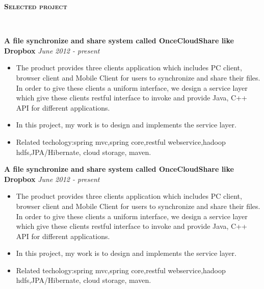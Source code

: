 \documentclass[9pt]{article}
\newenvironment{changemargin}[2]{%
  \begin{list}{}{%
    \setlength{\topsep}{0pt}%
    \setlength{\leftmargin}{#1}%
    \setlength{\rightmargin}{#2}%
    \setlength{\listparindent}{\parindent}%
    \setlength{\itemindent}{\parindent}%
    \setlength{\parsep}{\parskip}%
  }%
  \item[]}{\end{list}
}
\newcommand{\lineover}{
	\begin{changemargin}{-0.05in}{-0.05in}
		\vspace*{-8pt}
		\hrulefill \\
		\vspace*{-2pt}
	\end{changemargin}
}
\newcommand{\header}[1]{
	\begin{changemargin}{-0.5in}{-0.5in}
		\scshape{#1}\\
  	\lineover
	\end{changemargin}
}
\newenvironment{body} {
	\vspace*{-16pt}
	\begin{changemargin}{-0.25in}{-0.5in}
  }	
	{\end{changemargin}
}
\begin{document}
\smallskip


\header{\textbf{Selected project}}

\begin{body}
	\vspace{14pt}
	\textbf{A file synchronize and share system called OnceCloudShare like Dropbox} \hfill \emph{June 2012 - present}\\
	\vspace*{-4pt}
	\begin{itemize} \itemsep -0pt  %
		\item The product provides three clients application which includes PC client, browser client and Mobile Client for users to synchronize and share their files.
			 In order to give these clients a uniform interface, we design a service layer which give these clients restful interface to invoke and provide Java, C++ API for  different applications.
		\item In this project, my work is to design and implements the service layer. 
		\item Related techology:spring mvc,spring core,restful webservice,hadoop hdfs,JPA/Hibernate, cloud storage, maven.
	\end{itemize}
	\medskip
	\textbf{A file synchronize and share system called OnceCloudShare like Dropbox} \hfill \emph{June 2012 - present}\\
	\vspace*{-4pt}
	\begin{itemize} \itemsep -0pt  %
		\item The product provides three clients application which includes PC client, browser client and Mobile Client for users to synchronize and share their files.
			 In order to give these clients a uniform interface, we design a service layer which give these clients restful interface to invoke and provide Java, C++ API for  different applications.
		\item In this project, my work is to design and implements the service layer. 
		\item Related techology:spring mvc,spring core,restful webservice,hadoop hdfs,JPA/Hibernate, cloud storage, maven.
	\end{itemize}
\end{body}
\end{document}
